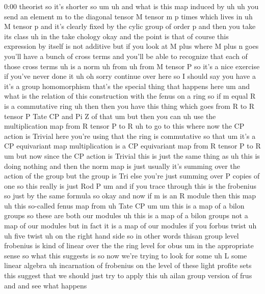 \begin{unfinished}{0:00}
theorist  so  it's  shorter  so
um  uh  and  what  is  this  map  induced  by
uh  uh  you  send  an  element  m  to  the
diagonal  tensor  M  tensor  m  p  times  which
lives  in  uh  M  tensor  p  and  it's  clearly
fixed  by  the  cylic  group  of  order  p  and
then  you  take  its  class
uh  in  the  take
chology  okay  and  the  point  is  that  of
course  this  expression  by  itself  is  not
additive  but  if  you  look  at  M  plus  where
M  plus  n  goes  you'll  have  a  bunch  of
cross  terms  and  you'll  be  able  to
recognize  that  each  of  those  cross  terms
uh  is  a  norm  uh
from  uh  from  M  tensor  P  so  it's  a  nice
exercise  if  you've  never  done  it
uh  oh
sorry  continue  over
here  so  I  should  say  you  have  a  it's  a
group  homomorphism  that's  the  special
thing  that  happens
here  um
and  what  is  the  relation  of  this
construction  with  the  fenus  on  a  ring  so
if  m  equal  R  is  a  commutative
ring  uh
then  then  you  have  this  thing  which  goes
from  R  to  R  tensor  P  Tate  CP  and  Pi  Z  of
that
um  but  then  you  can  uh  use  the
multiplication  map  from  R  tensor  P  to
R
uh  to  go  to  this  where  now  the  CP  action
is
Trivial  here  you're  using  that  the  ring
is  commutative  so  that  um  it's  a  CP
equivariant  map  multiplication  is  a  CP
equivariant  map  from  R  tensor  P  to
R  um  but  now  since  the  CP  action  is
Trivial  this  is  just  the  same  thing  as
uh  this  is  doing  nothing  and  then  the
norm  map  is  just  usually  it's  summing
over  the  action  of  the  group  but  the
group  is  Tri  else  you're  just  summing
over  P  copies  of  one  so  this  really  is
just  Rod
P  um  and  if  you  trace  through  this  is
the  frobenius  so  just  by  the  same
formula
so
okay
and  now  if  m  is  an  R
module  then  this  map  uh  this  so-called
fenus  map
from  uh  Tate
CP
um  um  this  is  a  map  of  a  bilon  groups  so
these  are  both  our
modules
uh  this  is  a  map  of  a  bilon
groups  not  a  map  of  our  modules  but  in
fact  it  is  a  map  of  our
modules  if  you  forbus  twist  uh  uh  five
twist  uh  on  the  right  hand
side  so  in  other  words  thisan  group
level  frobenius  is  kind  of  linear  over
the  the  ring  level  for  obus  um  in  the
appropriate
sense  so  what  this  suggests  is  so  now
we're  trying  to  look  for  some  uh  L  some
linear  algebra  uh  incarnation  of
frobenius  on  the  level  of  these  light
profite  sets  this  suggest  that  we  should
just  try  to  apply  this  uh  ailan  group
version  of  frus  and  and  see  what  happens

\end{unfinished}
